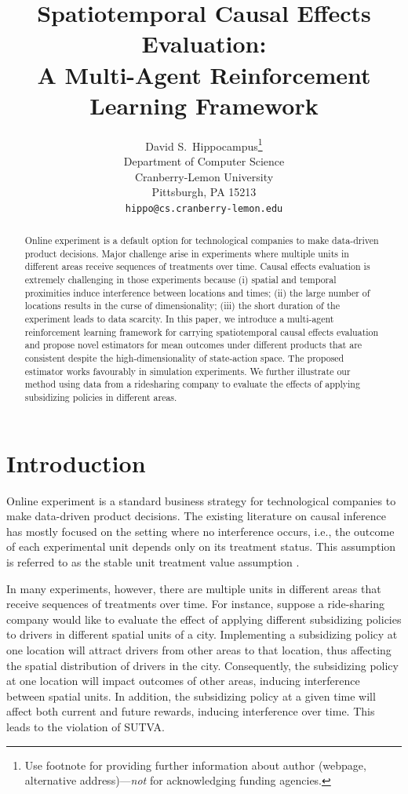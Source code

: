 \documentclass{article}
\title{Spatiotemporal Causal Effects Evaluation:\\ A Multi-Agent Reinforcement Learning Framework}
\author{%
	David S.~Hippocampus\thanks{Use footnote for providing further information
		about author (webpage, alternative address)---\emph{not} for acknowledging
		funding agencies.} \\
	Department of Computer Science\\
	Cranberry-Lemon University\\
	Pittsburgh, PA 15213 \\
	\texttt{hippo@cs.cranberry-lemon.edu} \\
}
\begin{document}
	
\maketitle

\begin{abstract}
	Online experiment is a default option for technological companies to make data-driven product decisions. Major challenge arise in experiments where multiple units in different areas receive sequences of treatments over time. Causal effects evaluation is extremely challenging in those experiments because (i) spatial and temporal proximities induce interference between locations and times; (ii) the large number of locations results in the curse of dimensionality; (iii) the short duration of the experiment leads to data scarcity. In this paper, we introduce a multi-agent reinforcement learning framework for carrying spatiotemporal causal effects evaluation and propose novel estimators for mean outcomes under different products that are consistent despite the high-dimensionality of state-action space. The proposed estimator works favourably in simulation experiments. We further illustrate our method using data from a ridesharing company to evaluate the effects of applying subsidizing policies in different areas. 
\end{abstract}

\section{Introduction}%
Online experiment is a standard business strategy for technological companies to make data-driven product decisions. The existing literature on causal inference has mostly focused on the setting where no interference occurs, i.e., the outcome of each experimental unit depends only on its treatment status. This assumption is referred to as the stable unit treatment value assumption \citep[SUTVA,][]{rubin1980randomization,rubin1986comment}. %

In many experiments, however, there are multiple units in different areas that receive sequences of treatments over time. For instance, suppose a ride-sharing company would like to evaluate the effect of applying different subsidizing policies to drivers in different spatial units of a city. Implementing a subsidizing policy at one location will attract drivers from other areas to that location, thus affecting the spatial distribution of drivers in the city. Consequently, the subsidizing policy at one location will impact outcomes of other areas, inducing interference between spatial units. In addition, the subsidizing policy at a given time will affect both current and future rewards, inducing interference over time. This leads to the violation of SUTVA.
\end{document}
